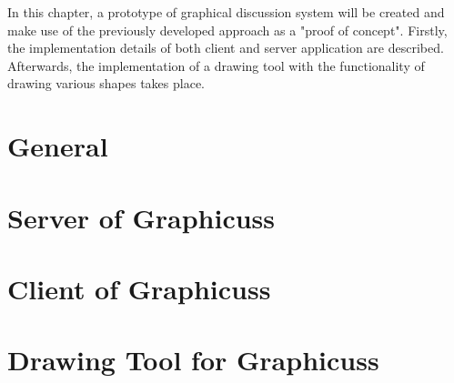In this chapter, a prototype of graphical discussion system will be created and make use of the previously developed approach as a "proof of concept". Firstly, the implementation details of both client and server application are described. Afterwards, the implementation of a drawing tool with the functionality of drawing various shapes takes place.


\section{General}


\section{Server of Graphicuss}


\section{Client of Graphicuss}


\section{Drawing Tool for Graphicuss}\label{sec:drawing-imp}


% 

